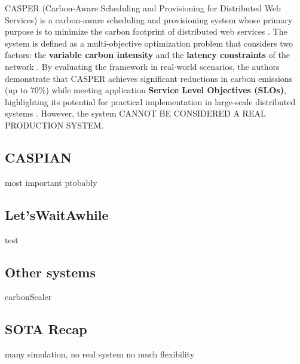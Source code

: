 CASPER (Carbon-Aware Scheduling and Provisioning for Distributed Web Services) is a carbon-aware scheduling and provisioning system whose primary purpose is to minimize the carbon footprint of distributed web services \cite{Souza_2023}.
The system is defined as a multi-objective optimization problem that considers two factors: the \textbf{variable carbon intensity} and the \textbf{latency constraints} of the network \cite{Souza_2023}.
By evaluating the framework in real-world scenarios, the authors demonstrate that CASPER achieves significant reductions in carbon emissions (up to 70\%) while meeting application \textbf{Service Level Objectives (SLOs)}, highlighting its potential for practical implementation in large-scale distributed systems \cite{Souza_2023}. However, the system CANNOT BE CONSIDERED A REAL PRODUCTION SYSTEM.




\subsection{CASPIAN}

most important ptobably

\subsection{Let'sWaitAwhile}

test

\subsection{Other systems}

carbonScaler




\subsection{SOTA Recap}

many simulation, no real system
no much flexibility






\newpage


